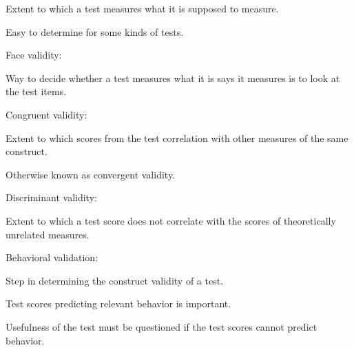 \begin{coloredlist}
    \item Extent to which a test measures what it is supposed to measure.
    \item Easy to determine for some kinds of tests.
    \item Face validity:
    \begin{coloredlist}
        \item Way to decide whether a test measures what it is says it measures is to look at the test items.
    \end{coloredlist}
    \item Congruent validity:
    \begin{coloredlist}
        \item Extent to which scores from the test correlation with other measures of the same construct.
        \item Otherwise known as convergent validity.
    \end{coloredlist}
    \item Discriminant validity:
    \begin{coloredlist}
        \item Extent to which a test score does not correlate with the scores of theoretically unrelated measures.
    \end{coloredlist}
    \item Behavioral validation:
    \begin{coloredlist}
        \item Step in determining the construct validity of a test.
        \item Test scores predicting relevant behavior is important.
        \item Usefulness of the test must be questioned if the test scores cannot predict behavior.
    \end{coloredlist}
\end{coloredlist}